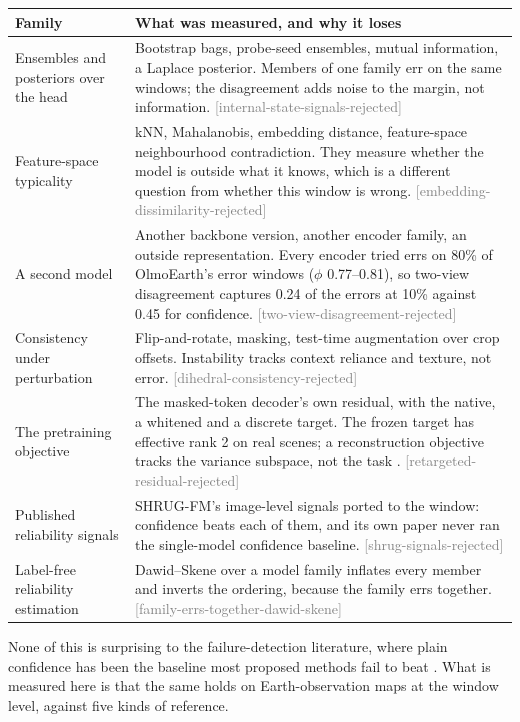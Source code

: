 \documentclass[11pt,a4paper]{article}
\newcommand{\claim}[1]{{\scriptsize\textsf{\textcolor{gray}{[#1]}}}}
\begin{document}
\begin{table}[h]
\centering\small
\begin{tabularx}{\linewidth}{lX}
\toprule
Family & What was measured, and why it loses \\
\midrule
Ensembles and posteriors over the head & Bootstrap bags, probe-seed ensembles, mutual information, a Laplace posterior. Members of one family err on the same windows; the disagreement adds noise to the margin, not information. \claim{internal-state-signals-rejected} \\
Feature-space typicality & kNN, Mahalanobis, embedding distance, feature-space neighbourhood contradiction. They measure whether the model is outside what it knows, which is a different question from whether this window is wrong. \claim{embedding-dissimilarity-rejected} \\
A second model & Another backbone version, another encoder family, an outside representation. Every encoder tried errs on 80\% of OlmoEarth's error windows ($\phi$ 0.77--0.81), so two-view disagreement captures 0.24 of the errors at 10\% against 0.45 for confidence. \claim{two-view-disagreement-rejected} \\
Consistency under perturbation & Flip-and-rotate, masking, test-time augmentation over crop offsets. Instability tracks context reliance and texture, not error. \claim{dihedral-consistency-rejected} \\
The pretraining objective & The masked-token decoder's own residual, with the native, a whitened and a discrete target. The frozen target has effective rank 2 on real scenes; a reconstruction objective tracks the variance subspace, not the task \citep{esser2025,balestriero2024}. \claim{retargeted-residual-rejected} \\
Published reliability signals & SHRUG-FM's \citep{gonzalez2025} image-level signals ported to the window: confidence beats each of them, and its own paper never ran the single-model confidence baseline. \claim{shrug-signals-rejected} \\
Label-free reliability estimation & Dawid--Skene over a model family inflates every member and inverts the ordering, because the family errs together. \claim{family-errs-together-dawid-skene} \\
\bottomrule
\end{tabularx}
\end{table}

None of this is surprising to the failure-detection literature, where plain
confidence has been the baseline most proposed methods fail to beat
\citep{hendrycks2017,jaeger2023}. What is measured here is that the same holds
on Earth-observation maps at the window level, against five kinds of reference.
\end{document}
